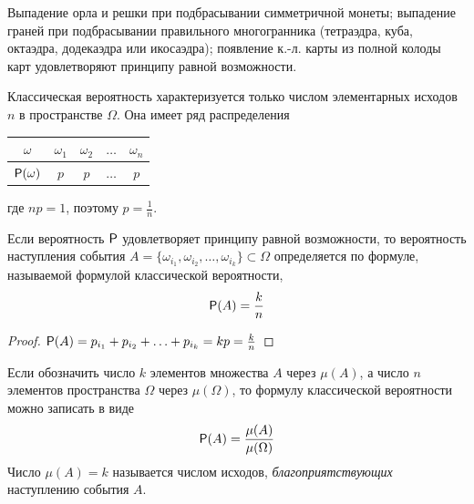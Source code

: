 Выпадение орла и решки при подбрасывании симметричной монеты; выпадение граней при подбрасывании правильного многогранника (тетраэдра, куба, октаэдра, додекаэдра или икосаэдра); появление к.-л. карты из полной
колоды карт удовлетворяют принципу равной возможности.

Классическая вероятность характеризуется только числом элементарных исходов $n$ в пространстве $\Omega$. Она имеет ряд распределения

\begin{center}
	\begin{tabular}{|c|c|c|c|c|}
		\hline
		$\omega$ & $\omega_1$ & $\omega_2$ & $\ldots$ & $\omega_n$ \\ \hline
		$\P(\omega)$  & $p$ & $p$ & $\ldots$  & $p$ \\ \hline
	\end{tabular}
\end{center}

где $np = 1$, поэтому $p = \frac{1}{n}$.


\begin{lemma}
	\label{lemma:4.10}
Если вероятность $\P$ удовлетворяет принципу равной возможности, то вероятность наступления события $A = \{ \omega_{i_1} , \omega_{i_2} , \ldots , \omega_{i_k} \} \subset \Omega$ определяется по формуле, называемой формулой классической вероятности,
$$\P(A) = \frac{k}{n}$$
\end{lemma} 
\begin{proof}
	$\P(A) = p_{i_1} + p_{i_2} + \ldots + p_{i_k} = kp = \frac{k}{n}$
\end{proof}

Если обозначить число $k$ элементов множества $A$ через $\mu(A)$, а число $n$ элементов пространства $\Omega$ через $\mu(\Omega)$, то формулу классической вероятности
можно записать в виде
$$\P(A) = \frac{\mu(A)}{\mu(\Omega)}$$
Число $\mu(A) = k$ называется числом исходов, \textit{благоприятствующих} наступлению события $A$.

